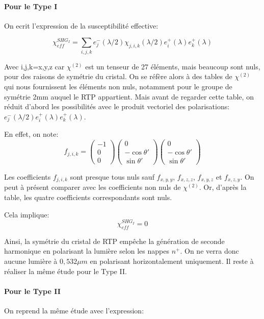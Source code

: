 \documentclass[a4paper,11pt]{report}
\begin{document}
\paragraph{Pour le Type I}
On ecrit l'expression de la susceptibilité effective:

\[\chi_{eff}^{SHG_I}=\sum_{i,j,k}e^-_j(\lambda/2)\chi_{j,i,k}(\lambda/2)e^+_i(\lambda)e^+_k(\lambda)\]

Avec {i,j,k}={x,y,z} car $\chi^{(2)}$ est un tenseur de 27 éléments, mais beaucoup sont nuls, pour des raisons de symétrie du cristal. On se réfère alors à des tables de $\chi^{(2)}$ qui nous fournissent les éléments non nuls, notamment pour le groupe de symétrie 2mm auquel le RTP appartient. Mais avant de regarder cette table, on réduit d'abord les possibilités avec le produit vectoriel des polarisations: $e^-_j(\lambda/2)e^+_i(\lambda)e^+_k(\lambda)$.

En effet, on note:
\[f_{j,i,k}=\begin{pmatrix}-1\\0\\0\end{pmatrix}\begin{pmatrix}0\\-\cos\theta'\\\sin\theta'\end{pmatrix}\begin{pmatrix}0\\-\cos\theta'\\\sin\theta'\end{pmatrix}\]

Les coefficients $f_{j,i,k}$ sont presque tous nuls sauf $f_{x,y,y}$, $f_{x,z,z}$, $f_{x,y,z}$ et $f_{x,z,y}$. 
On peut à présent comparer avec les coefficients non nuls de $\chi^{(2)}$. Or, d'après la table, les quatre coefficients correspondants sont nuls.

Cela implique:
\[\chi_{eff}^{SHG_I}=0\]

Ainsi, la symétrie du cristal de RTP empêche la génération de seconde harmonique en polarisant la lumière selon les nappes $n^+$. On ne verra donc aucune lumière à $0,532\mu m$ en polarisant horizontalement uniquement. Il reste à réaliser la même étude pour le Type II.

\paragraph{Pour le Type II}

On reprend la même étude avec l'expression: 
\end{document}

